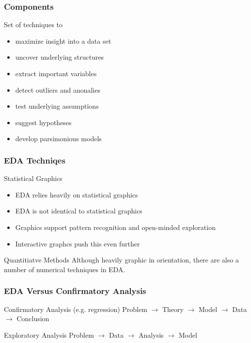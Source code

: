 \documentclass[nototal,handout]{beamer}
\begin{document}
\begin{frame}
	\frametitle{Components}
 
\begin{block}{Set of techniques to}
 \begin{itemize}
 \item  maximize insight into a data set
 \item  uncover underlying structures
 \item  extract important variables
 \item  detect outliers and anonalies
 \item  test underlying assumptions
 \item  suggest hypotheses
 \item  develop parsimonious models
 \end{itemize}
 \end{block} \end{frame} 

\begin{frame}
	\frametitle{EDA Techniqes}
 
\begin{block}{Statistical Graphics}
 \begin{itemize}
 \item  EDA relies heavily on statistical graphics
 \item  EDA is not identical to statistical graphics
 \item  Graphics support pattern recognition and open-minded exploration
 \item  Interactive graphcs push this even further
 \end{itemize}
 \end{block} 
\begin{block}{Quantitiatve Methods}
  Although heavily graphic in orientation, there are also a number
  of numerical techniques in EDA.
 \end{block} \end{frame} 

\begin{frame}
	\frametitle{EDA Versus Confirmatory Analysis}
 
\begin{block}{Confirmatory Analysis (e.g. regression)}
  Problem $\rightarrow$ Theory $\rightarrow$ Model $\rightarrow$ Data $\rightarrow$ Conclusion
 \end{block} 
\begin{block}{Exploratory Analysis}
  Problem $\rightarrow$ Data $\rightarrow$ Analysis $\rightarrow$ Model
 \end{block} \end{frame} 
\end{document}
